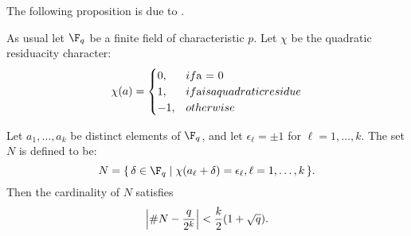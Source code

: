 The following proposition is due to {\BenOr} \cite{BenOr81}.

As usual let $\F_q$ be a finite field of characteristic $p$.  Let
$\chi$ be the quadratic residuacity character:
\[
\chi(a) = 
  \begin{cases}
    0, & if $a = 0$\\
    1,& if $a$ is a quadratic residue\\
    -1,& otherwise
  \end{cases}
\]
 
\begin{proposition}
\label{QRDistribution:Prop} Let $a_1, \ldots, a_k$ be distinct
elements of $\F_q$, and let $\epsilon_\ell = \pm1$ for $\ell = 1,
\dots, k$.  The set $N$ is defined to be:
\[
N = \{\, \delta \in \F_q \mid \chi(a_\ell + \delta) = \epsilon_\ell, \ell =
1, \ldots, k\,\}.
\]
Then the cardinality of $N$ satisfies
\[
\left|\#N - {q \over 2^k}\right| < {k \over 2}(1 + \sqrt{q}).
\]
\end{proposition}

